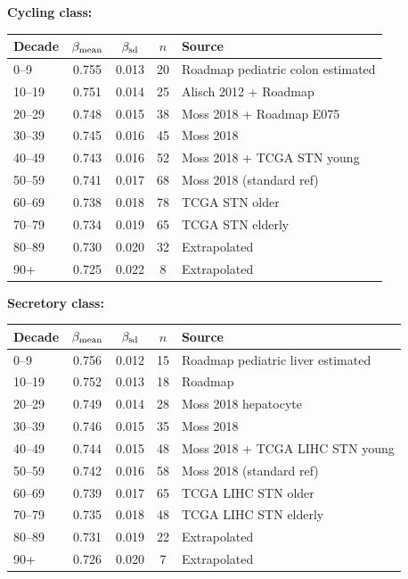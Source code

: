 \documentclass[12pt,a4paper]{article}
\begin{document}
\textbf{Cycling class:}

\begin{center}
\footnotesize
\begin{tabular}{lcccp{4cm}}
\toprule
Decade & $\beta_{\rm mean}$ & $\beta_{\rm sd}$ & $n$ & Source \\
\midrule
0--9   & 0.755 & 0.013 & 20 & Roadmap pediatric colon estimated \\
10--19 & 0.751 & 0.014 & 25 & Alisch 2012 + Roadmap \\
20--29 & 0.748 & 0.015 & 38 & Moss 2018 + Roadmap E075 \\
30--39 & 0.745 & 0.016 & 45 & Moss 2018 \\
40--49 & 0.743 & 0.016 & 52 & Moss 2018 + TCGA STN young \\
50--59 & 0.741 & 0.017 & 68 & Moss 2018 (standard ref) \\
60--69 & 0.738 & 0.018 & 78 & TCGA STN older \\
70--79 & 0.734 & 0.019 & 65 & TCGA STN elderly \\
80--89 & 0.730 & 0.020 & 32 & Extrapolated \\
90+    & 0.725 & 0.022 &  8 & Extrapolated \\
\bottomrule
\end{tabular}
\end{center}

\textbf{Secretory class:}

\begin{center}
\footnotesize
\begin{tabular}{lcccp{4cm}}
\toprule
Decade & $\beta_{\rm mean}$ & $\beta_{\rm sd}$ & $n$ & Source \\
\midrule
0--9   & 0.756 & 0.012 & 15 & Roadmap pediatric liver estimated \\
10--19 & 0.752 & 0.013 & 18 & Roadmap \\
20--29 & 0.749 & 0.014 & 28 & Moss 2018 hepatocyte \\
30--39 & 0.746 & 0.015 & 35 & Moss 2018 \\
40--49 & 0.744 & 0.015 & 48 & Moss 2018 + TCGA LIHC STN young \\
50--59 & 0.742 & 0.016 & 58 & Moss 2018 (standard ref) \\
60--69 & 0.739 & 0.017 & 65 & TCGA LIHC STN older \\
70--79 & 0.735 & 0.018 & 48 & TCGA LIHC STN elderly \\
80--89 & 0.731 & 0.019 & 22 & Extrapolated \\
90+    & 0.726 & 0.020 &  7 & Extrapolated \\
\bottomrule
\end{tabular}
\end{center}
\end{document}
